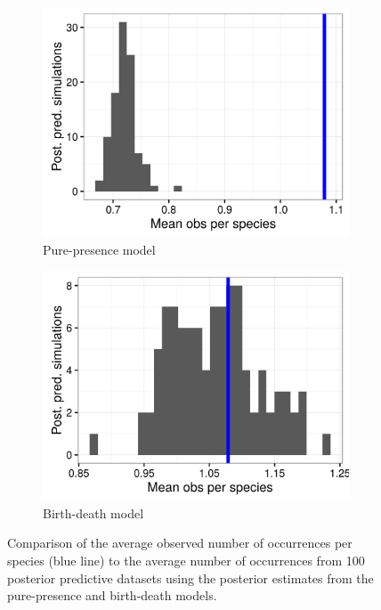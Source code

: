 \documentclass[12pt,letterpaper]{article}
\begin{document}
\begin{figure}[ht]
  \begin{subfigure}[b]{0.45\textwidth}
    \includegraphics[width=\textwidth,height=0.4\textheight,keepaspectratio=true]{figure/pred_occ}
    \caption{Pure-presence model}
    \label{fig:ppc_pure_presence}
  \end{subfigure}
  \begin{subfigure}[b]{0.45\textwidth}
    \includegraphics[width=\textwidth,height=0.4\textheight,keepaspectratio=true]{figure/pred_occ_bd}
    \caption{Birth-death model}
    \label{fig:ppc_birth_death}
  \end{subfigure}
  \caption[Posterior predictive check of average occurrence]{Comparison of the average observed number of occurrences per species (blue line) to the average number of occurrences from 100 posterior predictive datasets using the posterior estimates from the pure-presence and birth-death models.}
\end{figure}
\end{document}
